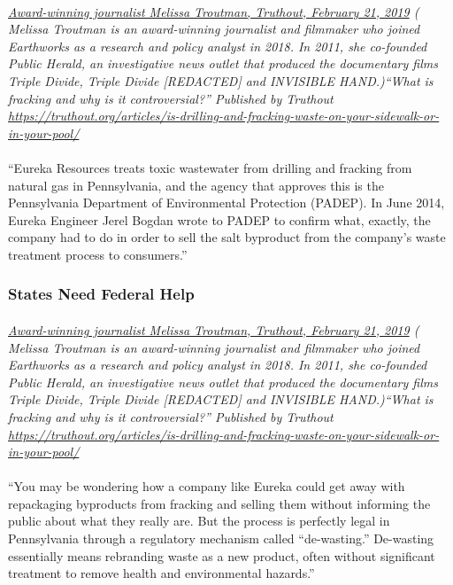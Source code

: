 \documentclass{article}
\begin{document}
\paragraph{}
\small
\textit{
\underline{Award-winning journalist Melissa Troutman, Truthout, February 21, 2019}
( Melissa Troutman is an award-winning journalist and filmmaker who joined Earthworks as a research and policy analyst in 2018. In 2011, she co-founded Public Herald, an investigative news outlet that produced the documentary films Triple Divide, Triple Divide [REDACTED] and INVISIBLE HAND.)``What is fracking and why is it controversial?'' Published by Truthout
\url{https://truthout.org/articles/is-drilling-and-fracking-waste-on-your-sidewalk-or-in-your-pool/}}
\normalsize
\paragraph{}
``Eureka Resources treats toxic wastewater from drilling and fracking from natural gas in Pennsylvania, and the agency that approves this is the Pennsylvania Department of Environmental Protection (PADEP). In June 2014, Eureka Engineer Jerel Bogdan wrote to PADEP to confirm what, exactly, the company had to do in order to sell the salt byproduct from the company’s waste treatment process to consumers.”

\subsubsection{States Need Federal Help}
\paragraph{}
\small
\textit{
\underline{Award-winning journalist Melissa Troutman, Truthout, February 21, 2019}
( Melissa Troutman is an award-winning journalist and filmmaker who joined Earthworks as a research and policy analyst in 2018. In 2011, she co-founded Public Herald, an investigative news outlet that produced the documentary films Triple Divide, Triple Divide [REDACTED] and INVISIBLE HAND.)``What is fracking and why is it controversial?'' Published by Truthout
\url{https://truthout.org/articles/is-drilling-and-fracking-waste-on-your-sidewalk-or-in-your-pool/}}
\normalsize
\paragraph{}
``You may be wondering how a company like Eureka could get away with repackaging byproducts from fracking and selling them without informing the public about what they really are. But the process is perfectly legal in Pennsylvania through a regulatory mechanism called “de-wasting.” De-wasting essentially means rebranding waste as a new product, often without significant treatment to remove health and environmental hazards.”
\end{document}
